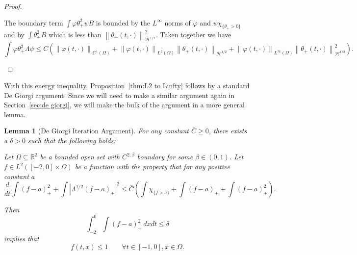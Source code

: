 \documentclass[11pt]{amsart}
\newtheorem{lemma}[theorem]{Lemma}
\theoremstyle{remark}
\theoremstyle{definition}
\newcommand{\R}{\mathbb{R}}
\newcommand{\norm}[1]{\left\lVert#1\right\rVert}
\newcommand{\paren}[1]{\left( #1 \right)}
\newcommand{\abs}[1]{\left\lvert #1 \right\rvert}
\newcommand{\grad}{\nabla}
\newcommand{\ddt}{\frac{d}{dt}}
\newcommand{\indic}[1]{\chi_{\{#1\}}}
\newcommand{\HD}{\mathcal{H}}
\begin{document}
\begin{proof}
\begin{itemize}
The boundary term $\int \varphi \theta_+^2 \psi B$ is bounded by the $L^\infty$ norms of $\varphi$ and $\psi \indic{\theta_+>0}$ and by $\int \theta_+^2 B$ which is less than $\norm{\theta_+(t,\cdot)}_{\HD^{1/2}}^2$.  Taken together we have
\[ \int \varphi \theta_+^2 \Lambda \psi \leq C \paren{ \norm{\varphi(t,\cdot)}_{C^1(\Omega)} + \norm{\varphi(t,\cdot)}_{L^2(\Omega)} \norm{\theta_+(t,\cdot)}_{\HD^{1/2}} + \norm{\varphi(t,\cdot)}_{L^\infty(\Omega)} \norm{\theta_+(t,\cdot)}_{\HD^{1/2}}^2 }. \]
%

\end{itemize}


\end{proof}

With this energy inequality, Proposition~\ref{thm:L2 to Linfty} follows by a standard De Giorgi argument.  Since we will need to make a similar argument again in Section~\ref{sec:de giorgi}, we will make the bulk of the argument in a more general lemma.  

\begin{lemma}[De Giorgi Iteration Argument] \label{thm:DG1 skeleton}
For any constant $\bar{C} \geq 0$, there exists a $\delta>0$ such that the following holds:

Let $\Omega \subseteq \R^2$ be a bounded open set with $C^{2,\beta}$ boundary for some $\beta \in (0,1)$.  
Let $f \in L^2([-2,0]\times\Omega)$ be a function with the property that for any positive constant $a$
\begin{equation} \label{DG energy ddt} \ddt \int (f-a)_+^2 + \int \abs{\Lambda^{1/2} (f-a)_+}^2 \leq \bar{C} \paren{ \int \indic{f > a} + \int (f-a)_+ + \int (f-a)_+^2 }. \end{equation}

Then
\[ \int_{-2}^0 \int (f-a)_+^2 \,dxdt \leq \delta \]
implies that
\[ f(t,x) \leq 1 \qquad \forall t\in[-1,0], x \in \Omega. \]
\end{lemma}
\end{document}
